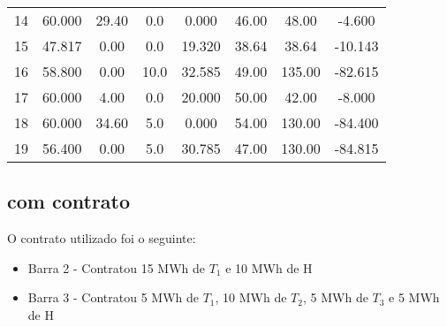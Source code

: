 \documentclass[a4paper,12pt,twoside]{article}
\begin{document}
\begin{center}
\begin{tabular}{ c c c c c c c c }
        14   & 60.000    & 29.40      & 0.0   & 0.000   & 46.00   & 48.00   & -4.600 \\
        15   & 47.817     & 0.00      & 0.0  & 19.320   & 38.64   & 38.64  & -10.143 \\
        16   & 58.800     & 0.00     & 10.0  & 32.585   & 49.00  & 135.00  & -82.615 \\
        17   & 60.000     & 4.00      & 0.0  & 20.000   & 50.00   & 42.00   & -8.000 \\
        18   & 60.000    & 34.60      & 5.0   & 0.000   & 54.00  & 130.00  & -84.400 \\
        19   & 56.400     & 0.00      & 5.0  & 30.785   & 47.00  & 130.00  & -84.815
    \end{tabular}
\end{center}

\subsection{com contrato}
O contrato utilizado foi o seguinte:
\begin{itemize}
    \item{Barra 2 - Contratou 15 MWh de \(T_1\) e 10 MWh de H}
    \item{Barra 3 - Contratou 5 MWh de \(T_1\), 10 MWh de \(T_2\), 5 MWh de \(T_3\) e 5 MWh de H}
\end{itemize}
\end{document}

